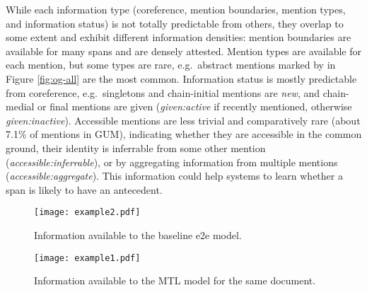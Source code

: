 \documentclass[11pt]{article}
\begin{document}
While each information type (coreference, mention boundaries, mention types, and information status) is not totally predictable from others, they overlap to some extent and exhibit different information densities: mention boundaries are available for many spans and are densely attested. Mention types are available for each mention, but some types are rare, e.g.~abstract mentions marked by \textcolor{gray}{\faCloud} in Figure \ref{fig:og-all} are the most common. Information status is mostly predictable from coreference, e.g.~singletons and chain-initial mentions are \textit{new}, and chain-medial or final mentions are given (\textit{given:active} if recently mentioned, otherwise \textit{given:inactive}). Accessible mentions are less trivial and comparatively rare (about 7.1\% of mentions in GUM), indicating whether they are accessible in the common ground, their identity is inferrable from some other mention (\textit{accessible:inferrable}), or by aggregating information from multiple mentions (\textit{accessible:aggregate}). This information could help systems to learn whether a span is likely to have an antecedent.

\begin{figure*}[t!bh]
\centering
\begin{subfigure}[b]{0.80\textwidth}
\centering
\texttt{[image: example2.pdf]}
\caption{Information available to the baseline e2e model.}
\label{fig:og-all-baseline}
\end{subfigure}
\hfill
\begin{subfigure}[b]{0.80\textwidth}
\centering
\texttt{[image: example1.pdf]}
\caption{Information available to the MTL model for the same document.}
\label{fig:og-all-mtl}
\end{subfigure}
\caption{Training data from an OntoGUM article in the news genre.}
\label{fig:og-all}
\end{figure*}
\end{document}
